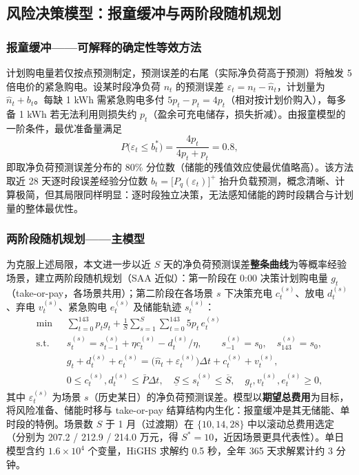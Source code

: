 \documentclass[zihao=-4,a4paper,UTF8,fontset=none]{ctexart}
\begin{document}
\subsection{风险决策模型：报童缓冲与两阶段随机规划}

\subsubsection{报童缓冲——可解释的确定性等效方法}

计划购电量若仅按点预测制定，预测误差的右尾（实际净负荷高于预测）将触发 5 倍电价的紧急购电。设某时段净负荷 $n_t$ 的预测误差 $\varepsilon_t = n_t - \hat n_t$，计划量为 $\hat n_t + b_t$。每缺 1 kWh 需紧急购电多付 $5p_t - p_t = 4p_t$（相对按计划价购入），每多备 1 kWh 若无法利用则损失约 $p_t$（盈余可充电储存，损失折减）。由报童模型的一阶条件，最优准备量满足
\begin{equation}
  P\big(\varepsilon_t \le b_t^*\big) = \frac{4p_t}{4p_t + p_t} = 0.8,
  \label{eq:newsvendor}
\end{equation}
即取净负荷预测误差分布的 80\% 分位数（储能的残值效应使最优值略高）。该方法取近 28 天逐时段误差经验分位数 $b_t = \big[P_q(\varepsilon_t)\big]^+$ 抬升负载预测，概念清晰、计算极简，但其局限同样明显：逐时段独立决策，无法感知储能的跨时段耦合与计划量的整体最优性。

\subsubsection{两阶段随机规划——主模型}

为克服上述局限，本文进一步以近 $S$ 天的净负荷预测误差\textbf{整条曲线}为等概率经验场景，建立两阶段随机规划（SAA 近似）：第一阶段在 0:00 决策计划购电量 $g_t$（take-or-pay，各场景共用）；第二阶段在各场景 $s$ 下决策充电 $c_t^{(s)}$、放电 $d_t^{(s)}$、弃电 $v_t^{(s)}$、紧急购电 $e_t^{(s)}$ 及储能轨迹 $s_t^{(s)}$：
\begin{align}
  \min\ & \sum_{t=0}^{143} p_t g_t + \frac{1}{S}\sum_{s=1}^{S}\sum_{t=0}^{143} 5 p_t\, e_t^{(s)}
  \label{eq:saaobj}\\
  \text{s.t.}\quad
  & s_t^{(s)} = s_{t-1}^{(s)} + \eta c_t^{(s)} - d_t^{(s)}/\eta,\qquad s_{-1}^{(s)} = s_0,\quad s_{143}^{(s)} = s_0,
  \label{eq:saasoc}\\
  & g_t + d_t^{(s)} + e_t^{(s)} = \big(\hat n_t + \varepsilon_t^{(s)}\big)\Delta t + c_t^{(s)} + v_t^{(s)},
  \label{eq:saabal}\\
  & 0 \le c_t^{(s)}, d_t^{(s)} \le \bar P \Delta t,\quad \underline S \le s_t^{(s)} \le \overline S,\quad g_t, v_t^{(s)}, e_t^{(s)} \ge 0,
  \nonumber
\end{align}
其中 $\varepsilon_t^{(s)}$ 为场景 $s$（历史某日）的净负荷预测误差。模型以\textbf{期望总费用}为目标，将风险准备、储能时移与 take-or-pay 结算结构内生化：报童缓冲是其无储能、单时段的特例。场景数 $S$ 于 1 月（过渡期）在 $\{10,14,28\}$ 中以滚动总费用选定（分别为 207.2 / 212.9 / 214.0 万元，得 $S^*=10$，近因场景更具代表性）。单日模型含约 $1.6\times 10^4$ 个变量，HiGHS 求解约 0.5 秒，全年 365 天求解累计约 3 分钟。
\end{document}
